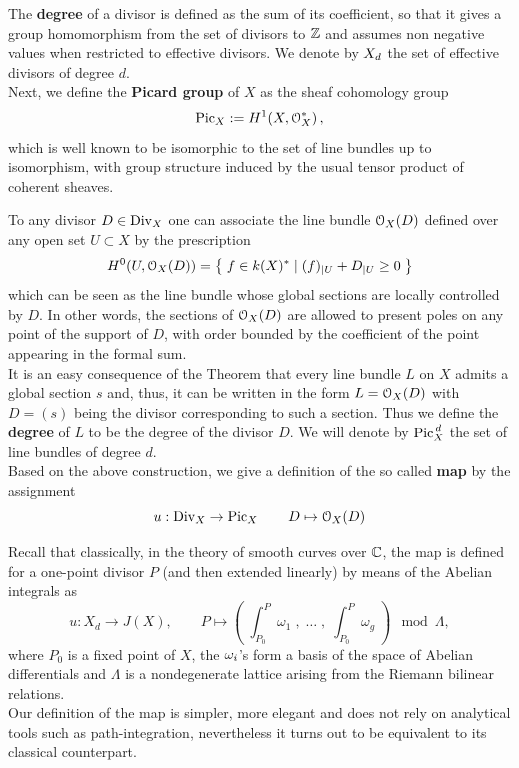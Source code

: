 	The \textbf{degree} of a divisor is defined as the sum of its coefficient, so that it gives a group homomorphism from the set of divisors to $\mathbb{Z}$ and assumes non negative values when restricted to effective divisors. We denote by $X_d$ the set of effective divisors of degree $d$.\\

	Next, we define the \textbf{Picard group} of $X$ as the sheaf cohomology group
	$$ \operatorname{Pic}_X := H^1(X, \mathcal{O}_X^*)\,, $$
	which is well known to be isomorphic to the set of line bundles up to isomorphism, with group structure induced by the usual tensor product of coherent sheaves. 

	To any divisor $D\in \operatorname{Div}_X$ one can associate the line bundle $\mathcal{O}_X(D)$ defined over any open set $U\subset X$ by the prescription
	$$ H^0(U, \mathcal{O}_X(D)) = \left\{\; f \in k(X)^* \mid (f)_{\mid U} + D_{\mid U} \geq 0 \;\right\} $$
	which can be seen as the line bundle whose global sections are locally controlled by $D$. 
	In other words, the sections of $\mathcal{O}_X(D)$ are allowed to present poles on any point of the support of $D$, with order bounded by the coefficient of the point appearing in the formal sum. \\
	It is an easy consequence of the \RR Theorem that every line bundle $L$ on $X$ admits a global section $s$ and, thus, it can be written in the form $L=\mathcal{O}_X(D)$ with $D=(s)$ being the divisor corresponding to such a section. Thus we define the \textbf{degree} of $L$ to be the degree of the divisor $D$. We will denote by $\operatorname{Pic}^{\,d}_X$ the set of line bundles of degree $d$.
	\\
	Based on the above construction, we give a definition of the so called \textbf{\AJJ map} by the assignment
	$$ u: \operatorname{Div}_X\to\operatorname{Pic}_X \qquad D\mapsto \mathcal{O}_X(D) $$ 
	\begin{rema}
		Recall that classically, in the theory of smooth curves over $\mathbb{C}$, the \AJJ map is defined for a one-point divisor $P$ (and then extended linearly) by means of the Abelian integrals as
		$$ u:X_d \to J(X), \qquad P \mapsto \left(\; \int_{P_0}^{P} \omega_1 \;,\; \dots\;,\; \int_{P_0}^{P} \omega_g \;\right) \mod \Lambda, $$
		where $P_0$ is a fixed point of $X$, the $\omega_i$'s form a basis of the space of Abelian differentials and $\Lambda$ is a nondegenerate lattice arising from the Riemann bilinear relations.\\
		Our definition of the \AJJ map is simpler, more elegant and does not rely on analytical tools such as path-integration, nevertheless it turns out to be equivalent to its classical counterpart.
	\end{rema}


